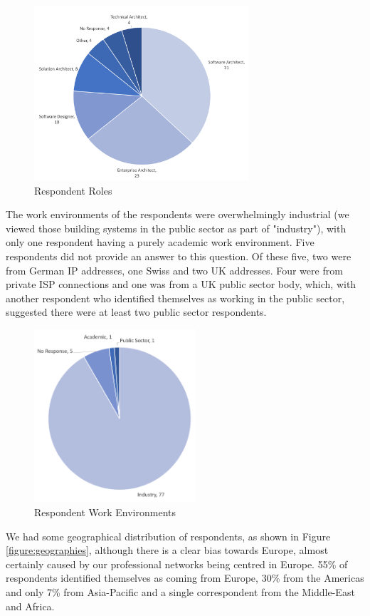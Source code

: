\begin{figure}
\centering
\includegraphics[width=8cm,trim={2 2 2 2},clip]{Figures/prioritisation-detailed-roles}
\caption{Respondent Roles}
\label{figure:resproles}
\end{figure}


The work environments of the respondents were overwhelmingly industrial (we viewed those building systems in the public sector as part of "industry"), with only one respondent having a purely academic work environment.  Five respondents did not provide an answer to this question.  Of these five, two were from German IP addresses, one Swiss and two UK addresses.  Four were from private ISP connections and one was from a UK public sector body, which, with another respondent who identified themselves as working in the public sector, suggested there were at least two public sector respondents.
 
\begin{figure}
\centering
\includegraphics[width=6cm,trim={2 2 2 2},clip]{Figures/prioritisation-workenv}
\caption{Respondent Work Environments}
\label{figure:workenvs}
\end{figure}

We had some geographical distribution of respondents, as shown in Figure \ref{figure:geographies}, although there is a clear bias towards Europe, almost certainly caused by our professional networks being centred in Europe.  55\% of respondents identified themselves as coming from Europe, 30\% from the Americas and only 7\% from Asia-Pacific and a single correspondent from the Middle-East and Africa.

